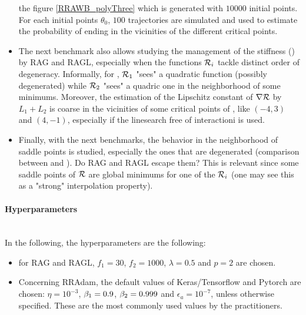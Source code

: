 \begin{itemize}
        the figure \ref{RRAWB_polyThree} which is generated with $10000$ initial points.  For each initial points $\theta_0$, $100$ trajectories are simulated and used to estimate
        the probability of ending in the vicinities of the different critical points.
	\item The next benchmark also allows studying the management of the stiffness (\polyFive) by RAG and RAGL, especially when the functions $\mathcal{R}_i$ tackle distinct order of
          degeneracy. Informally, for \polyFive, $\mathcal{R}_1$ "sees" a quadratic function (possibly degenerated) while $\mathcal{R}_2$ "sees" a quadric one in the neighborhood of some minimums.
          Moreover, the estimation of the Lipschitz constant of $\nabla \mathcal{R}$ by $L_1+L_2$ is coarse in the vicinities of some critical points of \polyFive, like $(-4,3)$ and $(4,-1)$,
          especially if the linesearch free of interactioni is used. 
	\item Finally, with the next benchmarks, the behavior in the neighborhood of saddle points is studied, especially the ones that are degenerated (comparison between \polyThree and \polyFive). Do RAG and RAGL escape them? This is relevant since some saddle points of $\mathcal{R}$ are global minimums for one of the $\mathcal{R}_i$ (one may see this as a "strong" interpolation property).
\end{itemize}

\paragraph{Hyperparameters}
~~\\
In the following, the hyperparameters are the following:
\begin{itemize}
	\item for RAG and RAGL, $f_1=30$, $f_2=1000$, $\lambda=0.5$ and $p=2$ are chosen. 
	\item Concerning RRAdam, the default values of Keras/Tensorflow and Pytorch are chosen: $\eta=10^{-3}$, $\beta_1=0.9$, $\beta_2=0.999$ and $\epsilon_a=10^{-7}$, unless
          otherwise specified. These are the most commonly used values by the practitioners.
\end{itemize}

